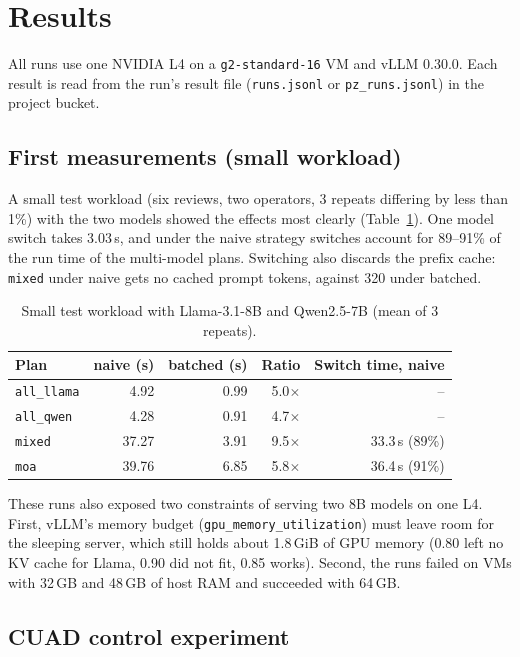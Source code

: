 \documentclass[11pt,a4paper]{article}
\newcommand{\code}[1]{\texttt{#1}}
\begin{document}
\section{Results}\label{sec:results}

All runs use one NVIDIA L4 on a \code{g2-standard-16} VM and vLLM 0.30.0. Each result is read from
the run's result file (\code{runs.jsonl} or \code{pz\_runs.jsonl}) in the project bucket.

\subsection{First measurements (small workload)}

A small test workload (six reviews, two operators, 3 repeats differing by less than 1\%) with the two
models showed the effects most clearly (Table~\ref{tab:smoke}). One model switch takes
3.03\,s, and under the naive strategy switches account for 89--91\% of the run time of the
multi-model plans. Switching also discards the prefix cache: \code{mixed} under naive gets no cached
prompt tokens, against 320 under batched.

\begin{table}[h]
\centering\small
\begin{tabular}{@{}lrrrr@{}}
\toprule
Plan & naive (s) & batched (s) & Ratio & Switch time, naive \\
\midrule
\code{all\_llama} & 4.92 & 0.99 & 5.0$\times$ & -- \\
\code{all\_qwen}  & 4.28 & 0.91 & 4.7$\times$ & -- \\
\code{mixed}      & 37.27 & 3.91 & 9.5$\times$ & 33.3\,s (89\%) \\
\code{moa}        & 39.76 & 6.85 & 5.8$\times$ & 36.4\,s (91\%) \\
\bottomrule
\end{tabular}
\caption{Small test workload with Llama-3.1-8B and Qwen2.5-7B (mean of 3 repeats).}\label{tab:smoke}
\end{table}

These runs also exposed two constraints of serving two 8B models on one L4. First, vLLM's memory
budget (\code{gpu\_memory\_utilization}) must leave room for the sleeping server, which still holds about
1.8\,GiB of GPU memory (0.80 left no KV cache for Llama, 0.90 did not fit, 0.85 works). Second, the runs
failed on VMs with 32\,GB and 48\,GB of host RAM and succeeded with 64\,GB.

\subsection{CUAD control experiment}
\end{document}
